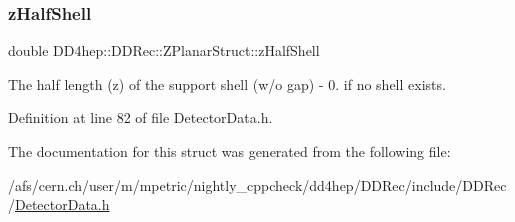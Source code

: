 \subsubsection{\texorpdfstring{z\+Half\+Shell}{zHalfShell}}
{\footnotesize\ttfamily double D\+D4hep\+::\+D\+D\+Rec\+::\+Z\+Planar\+Struct\+::z\+Half\+Shell}



The half length (z) of the support shell (w/o gap) -\/ 0. if no shell exists. 



Definition at line 82 of file Detector\+Data.\+h.



The documentation for this struct was generated from the following file\+:\begin{DoxyCompactItemize}
\item 
/afs/cern.\+ch/user/m/mpetric/nightly\+\_\+cppcheck/dd4hep/\+D\+D\+Rec/include/\+D\+D\+Rec/\hyperlink{_detector_data_8h}{Detector\+Data.\+h}\end{DoxyCompactItemize}
